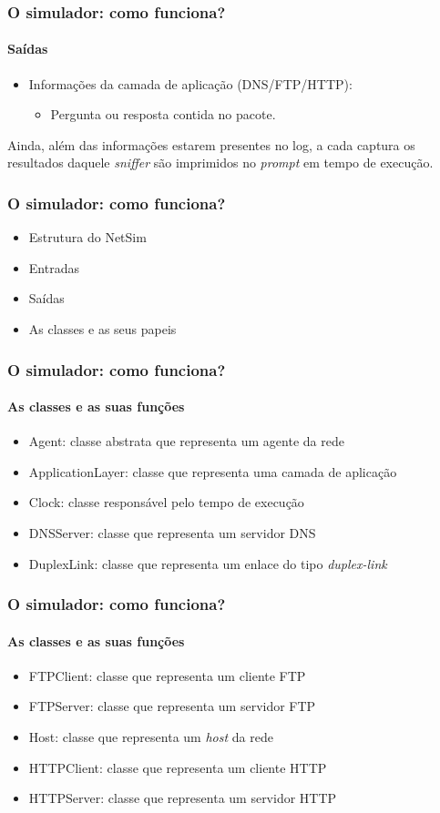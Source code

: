 \documentclass{beamer}
\begin{document}
\begin{frame}
	\frametitle{O simulador: como funciona?}
	\framesubtitle{Saídas}
	\begin{itemize}
		\item Informações da camada de aplicação (DNS/FTP/HTTP):
		\begin{itemize}
			\item Pergunta ou resposta contida no pacote.
		\end{itemize}
	\end{itemize}
	Ainda, além das informações estarem presentes no log, a cada captura os resultados daquele \textit{sniffer}
	são imprimidos no \textit{prompt} em tempo de execução.
\end{frame}

\begin{frame}
	\frametitle{O simulador: como funciona?}
	\begin{itemize}
		\item \textcolor{covered}{Estrutura do NetSim}
		\item \textcolor{covered}{Entradas}
		\item \textcolor{covered}{Saídas}
		\item As classes e as seus papeis
	\end{itemize}
\end{frame}

\begin{frame}
	\frametitle{O simulador: como funciona?}
	\framesubtitle{As classes e as suas funções}
	\begin{itemize}
		\item Agent: classe abstrata que representa um agente da rede
		\item ApplicationLayer: classe que representa uma camada de aplicação
		\item Clock: classe responsável pelo tempo de execução
		\item DNSServer: classe que representa um servidor DNS
		\item DuplexLink: classe que representa um enlace do tipo \textit{duplex-link}
	\end{itemize}
\end{frame}

\begin{frame}
	\frametitle{O simulador: como funciona?}
	\framesubtitle{As classes e as suas funções}
	\begin{itemize}
		\item FTPClient: classe que representa um cliente FTP
		\item FTPServer: classe que representa um servidor FTP
		\item Host: classe que representa um \textit{host} da rede
		\item HTTPClient: classe que representa um cliente HTTP
		\item HTTPServer: classe que representa um servidor HTTP
	\end{itemize}
\end{frame}
\end{document}
